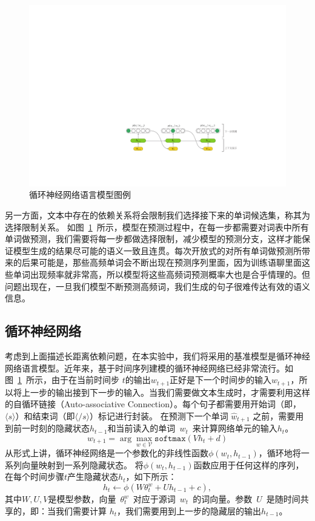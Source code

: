 \begin{figure}[!b]
  \centering
  \includegraphics[width=.99\columnwidth]{./figures/lm.pdf}
  \caption{循环神经网络语言模型图例}
  \label{fig:lm}
\end{figure}

另一方面，文本中存在的依赖关系将会限制我们选择接下来的单词候选集，称其为选择限制关系。
如图~\ref{fig:lm}~所示，模型在预测过程中，在每一步都需要对词表中所有单词做预测，我们需要将每一步都做选择限制，减少模型的预测分支，这样才能保证模型生成的结果尽可能的语义一致且连贯。每次开放式的对所有单词做预测所带来的后果可能是，那些高频单词会不断出现在预测序列里面，因为训练语聊里面这些单词出现频率就非常高，所以模型将这些高频词预测概率大也是合乎情理的。但问题出现在，一旦我们模型不断预测高频词，我们生成的句子很难传达有效的语义信息。

\subsection{循环神经网络}
考虑到上面描述长距离依赖问题，在本实验中，我们将采用的基准模型是循环神经网络语言模型。近年来，基于时间序列建模的循环神经网络已经非常流行。如图~\ref{fig:lm}~所示，由于在当前时间步 $t$的输出$w_{t+1}$正好是下一个时间步的输入$w_{t+1}$，所以将上一步的输出接到下一步的输入。当我们需要做文本生成时，才需要利用这样的自循环链接（Auto-associative Connection）。每个句子都需要用开始词（即，$\langle s\rangle$）和结束词（即$\langle / s\rangle$）标记进行封装。 在预测下一个单词 $\hat w_{t+1}$ 之前，需要用到前一时刻的隐藏状态$h_{t-1}$和当前读入的单词~$w_t$~来计算网络单元的输入$h_t$。
\begin{equation}
  \hat w_{t+1}=\arg\max_{w\in\mathcal{V}} \mathtt{softmax}(Vh_t+d)
\end{equation}
从形式上讲，循环神经网络是一个参数化的非线性函数$\phi(w_t,h_{t-1})$，循环地将一系列向量映射到一系列隐藏状态。 将$\phi(w_t,h_{t-1})$函数应用于任何这样的序列，在每个时间步骤$t$产生隐藏状态$h_t$，如下所示：
\begin{equation}
  h_t \leftarrow  \phi(W\theta^w_t + U h_{t-1} +c),
\end{equation}
其中$ W,U,V $是模型参数，向量~$\theta^w_t$~对应于源词~$w_t$~的词向量。参数~$U$~是随时间共享的，即：当我们需要计算 $h_t$，我们需要用到上一步的隐藏层的输出$h_{t-1}$。

